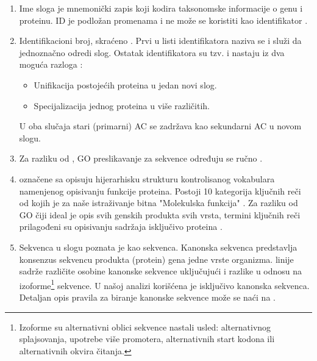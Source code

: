 \begin{enumerate}
  \item Ime sloga   je mnemonički zapis koji kodira
    taksonomske informacije o genu i proteinu. ID je podložan promenama 
    i ne može se koristiti kao identifikator \parencite{www_uniprot}.
  \item Identifikacioni broj, skraćeno  .
    Prvi u listi identifikatora naziva se  i služi da
    jednoznačno odredi slog. Ostatak identifikatora su tzv.  i
    nastaju iz dva moguća razloga \parencite{svisprot2003, www_uniprot}:
    \begin{itemize}
      \item Unifikacija postojećih proteina u jedan novi slog. 
      \item Specijalizacija jednog proteina u više različitih.
    \end{itemize}
    U oba slučaja stari (primarni) AC se zadržava kao sekundarni AC u novom slogu.

  \item Za razliku od \trembl, GO preslikavanje za \swissprot sekvence određuju se ručno \parencite{www_uniprot}.

  \item {}  označene sa  opisuju
    hijerarhisku strukturu kontrolisanog vokabulara namenjenog opisivanju
    funkcije proteina. Postoji 10 kategorija ključnih reči od kojih je za naše
    istraživanje bitna "Molekulska funkcija"  \parencite{svisprot2003}.  Za
    razliku od GO čiji ideal je opis svih genskih produkta svih vrsta, termini
    ključnih reči prilagođeni su opisivanju sadržaja isključivo \swissprot
    proteina \parencite{www_uniprot}.

  \item Sekvenca  u slogu poznata je kao 
     sekvenca. Kanonska sekvenca predstavlja konsenzus sekvencu
    produkta (protein) gena jedne vrste organizma.   linije sadrže
    različite osobine kanonske sekvence uključujući i razlike u odnosu na
    izoforme\footnote{Izoforme su alternativni oblici sekvence nastali usled:
    alternativnog splajsovanja, upotrebe više promotera, alternativnih start
  kodona ili alternativnih okvira čitanja.} sekvence.  U našoj analizi
  korišćena je isključivo kanonska sekvenca. Detaljan opis pravila za biranje
  kanonske sekvence može se naći na \cite{www_uniprot}.


\end{enumerate}
